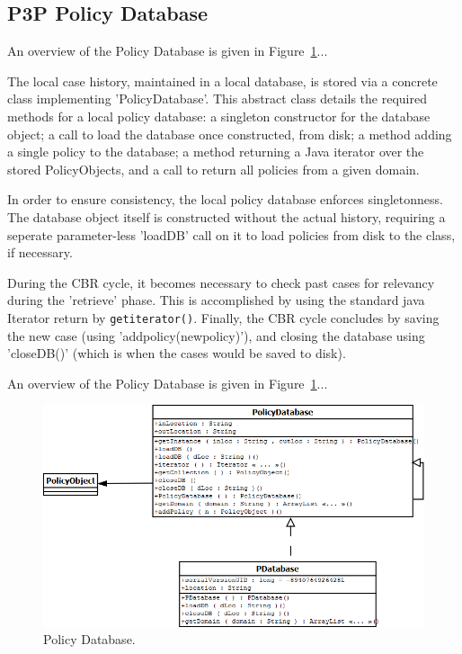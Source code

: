\subsection{P3P Policy Database}

An overview of the Policy Database is given in Figure~\ref{pd_fig}...

The local case history, maintained in a local database, is stored via a concrete class implementing 'PolicyDatabase'. This abstract class details the required methods for a local policy database: a singleton constructor for the database object; a call to load the database once constructed, from disk; a method adding a single policy to the database; a method returning a Java iterator over the stored PolicyObjects, and a call to return all policies from a given domain.

In order to ensure consistency, the local policy database enforces singletonness. The database object itself is constructed without the actual history, requiring a seperate parameter-less 'loadDB' call on it to load policies from disk to the class, if necessary.

During the CBR cycle, it becomes necessary to check past cases for relevancy during the 'retrieve' phase. This is accomplished by using the standard java Iterator return by \texttt{getiterator()}.
Finally, the CBR cycle concludes by saving the new case (using 'addpolicy(newpolicy)'), and closing the database using 'closeDB()' (which is when the cases would be saved to disk).

An overview of the Policy Database is given in Figure~\ref{pd_fig}...



\begin{figure}[htbp]
\begin{center}
\includegraphics[width = \textwidth]{DesignReport/uml/pd.png}
\caption{Policy Database.}
\label{pd_fig}
\end{center}
\end{figure}

